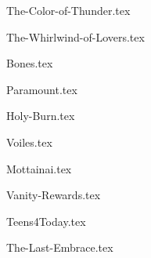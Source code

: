 \begin{songs}{}

  {The-Color-of-Thunder.tex}
  \sclearpage
  
  {The-Whirlwind-of-Lovers.tex}
  \sclearpage
  
  {Bones.tex}
  \sclearpage
  
  {Paramount.tex}
  \sclearpage
  
  {Holy-Burn.tex}
  \sclearpage

  {Voiles.tex}
  \sclearpage
  
  {Mottainai.tex}
  \sclearpage
  
  {Vanity-Rewards.tex}
  \sclearpage
  
  {Teens4Today.tex}
  \sclearpage
  
  {The-Last-Embrace.tex}
  \sclearpage
  

\end{songs}
